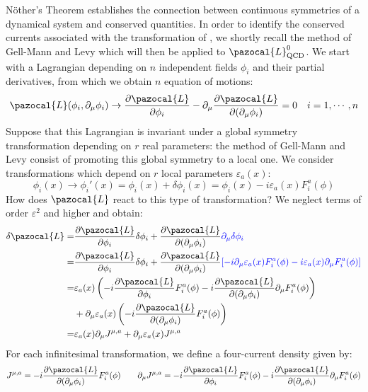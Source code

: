 \documentclass[../main.tex]{subfiles}
\begin{document}
\begin{kaobox}[frametitle=N\"other's Theorem]
N\"other's Theorem establishes the connection between continuous symmetries of a dynamical system and conserved quantities. In order to identify the conserved currents associated with the transformation of , we shortly recall the method of Gell-Mann and Levy which will then be applied to $\pazocal{L}_{\text{QCD}}^0$. We start with a Lagrangian depending on $n$ independent fields $\phi_i$ and their partial derivatives, from which we obtain $n$ equation of motions:
\[
\pazocal{L}(\phi_i,\partial_\mu\phi_i)\to\frac{\partial\pazocal{L}}{\partial\phi_i}-\partial_\mu\frac{\partial\pazocal{L}}{\partial(\partial_\mu\phi_i)}=0 \quad i=1,\cdots,n
\]
Suppose that this Lagrangian is invariant under a global symmetry transformation depending on $r$ real parameters: the method of Gell-Mann and Levy consist of promoting this global symmetry to a local one. We consider transformations which depend on $r$ local parameters $\varepsilon_a(x)$:
\[
\phi_i(x)\to\phi_i'(x)=\phi_i(x)+\delta\phi_i(x)=\phi_i(x)-i\varepsilon_a(x)F_i^a(\phi)
\]
How does $\pazocal{L}$ react to this type of transformation? We neglect terms of order $\varepsilon^2$ and higher and obtain:
\begin{align*}
\delta\pazocal{L}=&\frac{\partial\pazocal{L}}{\partial\phi_i}\delta\phi_i+\frac{\partial\pazocal{L}}{\partial(\partial_\mu\phi_i)}{\color{blue}\partial_\mu\delta\phi_i}\\
=&\frac{\partial\pazocal{L}}{\partial\phi_i}\delta\phi_i+\frac{\partial\pazocal{L}}{\partial(\partial_\mu\phi_i)}{\color{blue}[-i\partial_\mu\varepsilon_a(x)F_i^a(\phi)-i\varepsilon_a(x)\partial_\mu F_i^a(\phi)]}\\
=&\varepsilon_a(x)\left(-i\frac{\partial\pazocal{L}}{\partial\phi_i}F_i^a(\phi)-i\frac{\partial\pazocal{L}}{\partial(\partial_\mu\phi_i)}\partial_\mu F_i^a(\phi)\right)\\
&+\partial_\mu\varepsilon_a(x)\left(-i\frac{\partial\pazocal{L}}{\partial(\partial_\mu\phi_i)}F_i^a(\phi)\right)\\
=&\varepsilon_a(x)\partial_\mu J^{\mu,a}+\partial_\mu\varepsilon_a(x)J^{\mu,a}
\end{align*}
For each infinitesimal transformation, we define a four-current density given by:
\[
J^{\mu,a}=-i\frac{\partial\pazocal{L}}{\partial(\partial_\mu\phi_i)}F_i^a(\phi) \qquad \partial_\mu J^{\mu,a}=-i\frac{\partial\pazocal{L}}{\partial\phi_i}F_i^a(\phi)-i\frac{\partial\pazocal{L}}{\partial(\partial_\mu\phi_i)}\partial_\mu F_i^a(\phi)
\]
\end{kaobox}
\end{document}
